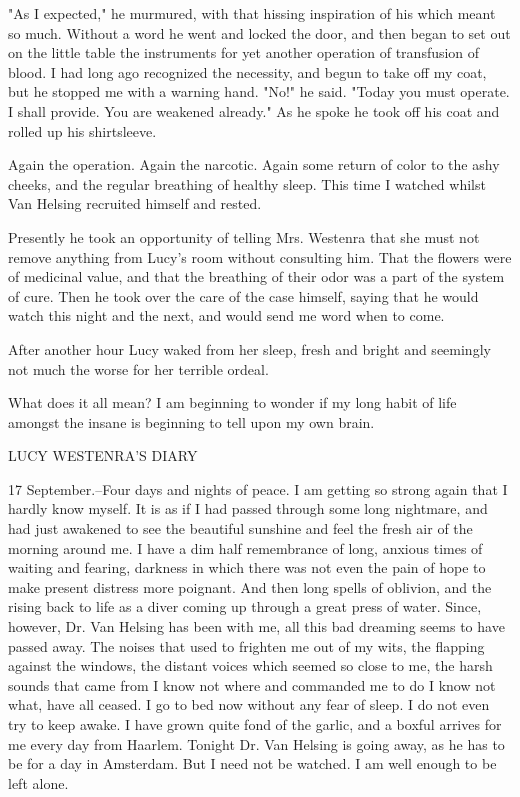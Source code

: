 "As I expected," he murmured, with that hissing inspiration of his which meant so much. Without a word he went and locked the door, and then began to set out on the little table the instruments for yet another operation of transfusion of blood. I had long ago recognized the necessity, and begun to take off my coat, but he stopped me with a warning hand. "No!" he said. "Today you must operate. I shall provide. You are weakened already." As he spoke he took off his coat and rolled up his shirtsleeve. 

Again the operation. Again the narcotic. Again some return of color to the ashy cheeks, and the regular breathing of healthy sleep. This time I watched whilst Van Helsing recruited himself and rested. 

Presently he took an opportunity of telling Mrs. Westenra that she must not remove anything from Lucy's room without consulting him. That the flowers were of medicinal value, and that the breathing of their odor was a part of the system of cure. Then he took over the care of the case himself, saying that he would watch this night and the next, and would send me word when to come. 

After another hour Lucy waked from her sleep, fresh and bright and seemingly not much the worse for her terrible ordeal. 

What does it all mean? I am beginning to wonder if my long habit of life amongst the insane is beginning to tell upon my own brain. 

LUCY WESTENRA'S DIARY 

17 September.--Four days and nights of peace. I am getting so strong again that I hardly know myself. It is as if I had passed through some long nightmare, and had just awakened to see the beautiful sunshine and feel the fresh air of the morning around me. I have a dim half remembrance of long, anxious times of waiting and fearing, darkness in which there was not even the pain of hope to make present distress more poignant. And then long spells of oblivion, and the rising back to life as a diver coming up through a great press of water. Since, however, Dr. Van Helsing has been with me, all this bad dreaming seems to have passed away. The noises that used to frighten me out of my wits, the flapping against the windows, the distant voices which seemed so close to me, the harsh sounds that came from I know not where and commanded me to do I know not what, have all ceased. I go to bed now without any fear of sleep. I do not even try to keep awake. I have grown quite fond of the garlic, and a boxful arrives for me every day from Haarlem. Tonight Dr. Van Helsing is going away, as he has to be for a day in Amsterdam. But I need not be watched. I am well enough to be left alone. 

